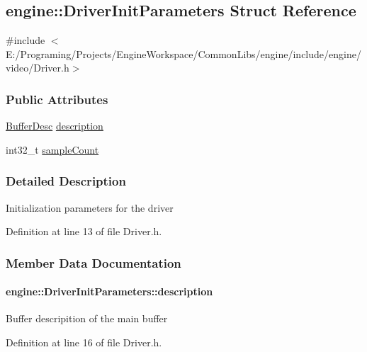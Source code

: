 \hypertarget{a00028}{}\subsection{engine\+:\+:Driver\+Init\+Parameters Struct Reference}
\label{a00028}


{\ttfamily \#include $<$E\+:/\+Programing/\+Projects/\+Engine\+Workspace/\+Common\+Libs/engine/include/engine/video/\+Driver.\+h$>$}

\subsubsection*{Public Attributes}
\begin{DoxyCompactItemize}
\item 
\hyperlink{a00007}{Buffer\+Desc} \hyperlink{a00028_a3c2e3a43440396f00417f098628c6649}{description}
\item 
int32\+\_\+t \hyperlink{a00028_afab1afded563f9ab42273f7993cdf3ed}{sample\+Count}
\end{DoxyCompactItemize}


\subsubsection{Detailed Description}
Initialization parameters for the driver 

Definition at line 13 of file Driver.\+h.



\subsubsection{Member Data Documentation}
\paragraph[{\texorpdfstring{description}{description}}]{ engine\+::\+Driver\+Init\+Parameters\+::description}\hypertarget{a00028_a3c2e3a43440396f00417f098628c6649}{}\label{a00028_a3c2e3a43440396f00417f098628c6649}
Buffer descripition of the main buffer 

Definition at line 16 of file Driver.\+h.

